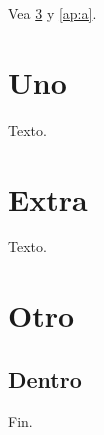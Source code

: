 \documentclass{article}
\begin{document}
Vea \ref{ap:b} y \autoref{ap:a}.
\section{Uno}
Texto.
\appendix
\section{Extra}\label{ap:a}
Texto.
\section{Otro}\label{ap:b}
\subsection{Dentro}
Fin.
\end{document}
